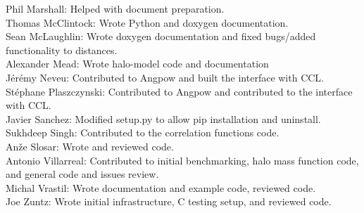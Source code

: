 Phil Marshall: Helped with document preparation. \\
Thomas McClintock: Wrote Python and doxygen documentation. \\
Sean McLaughlin: Wrote doxygen documentation and fixed bugs/added functionality to distances. \\
Alexander Mead: Wrote halo-model code and documentation \\
J\'er\'emy Neveu: Contributed to Angpow and built the interface with CCL. \\
St\'ephane Plaszczynski: Contributed to Angpow and contributed to the interface with CCL. \\
Javier Sanchez: Modified setup.py to allow pip installation and uninstall. \\
Sukhdeep Singh: Contributed to the correlation functions code. \\
An\v{z}e Slosar: Wrote and reviewed code. \\
Antonio Villarreal: Contributed to initial benchmarking, halo mass function code, and general code and issues review. \\
Michal Vrastil: Wrote documentation and example code, reviewed code. \\
Joe Zuntz: Wrote initial infrastructure, C testing setup, and reviewed code. \\
